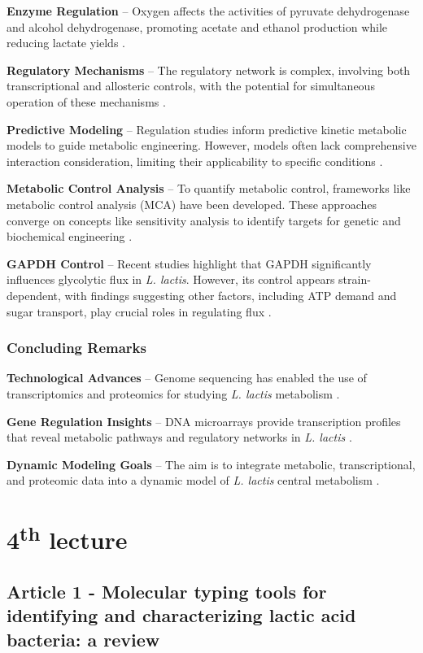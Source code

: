 \textbf{Enzyme Regulation} – Oxygen affects the activities of pyruvate dehydrogenase and alcohol dehydrogenase, promoting acetate and ethanol production while reducing lactate yields \cite*{L3-SugarMet}.

\textbf{Regulatory Mechanisms} – The regulatory network is complex, involving both transcriptional and allosteric controls, with the potential for simultaneous operation of these mechanisms \cite*{L3-SugarMet}.

\textbf{Predictive Modeling} – Regulation studies inform predictive kinetic metabolic models to guide metabolic engineering. However, models often lack comprehensive interaction consideration, limiting their applicability to specific conditions \cite*{L3-SugarMet}.

\textbf{Metabolic Control Analysis} – To quantify metabolic control, frameworks like metabolic control analysis (MCA) have been developed. These approaches converge on concepts like sensitivity analysis to identify targets for genetic and biochemical engineering \cite*{L3-SugarMet}.

\textbf{GAPDH Control} – Recent studies highlight that GAPDH significantly influences glycolytic flux in \textit{L. lactis}. However, its control appears strain-dependent, with findings suggesting other factors, including ATP demand and sugar transport, play crucial roles in regulating flux \cite*{L3-SugarMet}.
\subsubsection*{Concluding Remarks}
\textbf{Technological Advances} – Genome sequencing has enabled the use of transcriptomics and proteomics for studying \textit{L. lactis} metabolism \cite*{L3-SugarMet}.

\textbf{Gene Regulation Insights} – DNA microarrays provide transcription profiles that reveal metabolic pathways and regulatory networks in \textit{L. lactis} \cite*{L3-SugarMet}.

\textbf{Dynamic Modeling Goals} – The aim is to integrate metabolic, transcriptional, and proteomic data into a dynamic model of \textit{L. lactis} central metabolism \cite*{L3-SugarMet}.

\section{4\texorpdfstring{\textsuperscript{th}}{th} lecture}
\subsection{ Article 1 - Molecular typing tools for identifying and characterizing lactic acid bacteria: a review}
